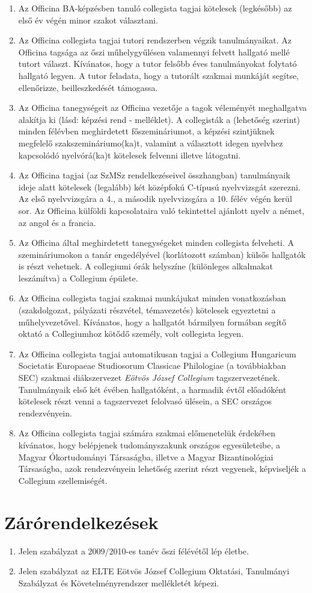 \documentclass{rulebook}
\begin{document}
\begin{enumerate}
	\item Az Officina BA-képzésben tanuló collegista tagjai kötelesek (legkésőbb) az első év végén minor szakot választani.
	\item Az Officina collegista tagjai tutori rendszerben végzik tanulmányaikat. Az Officina tagsága az őszi műhelygyűlésen valamennyi felvett hallgató mellé tutort választ. Kívánatos, hogy a tutor felsőbb éves tanulmányokat folytató hallgató legyen. A tutor feladata, hogy a tutorált szakmai munkáját segítse, ellenőrizze, beilleszkedését támogassa.
	\item Az Officina tanegységeit az Officina vezetője a tagok véleményét meghallgatva alakítja ki (lásd: képzési rend - melléklet). A collegisták a (lehetőség szerint) minden félévben meghirdetett főszemináriumot, a képzési szintjüknek megfelelő szakszemináriumo(ka)t, valamint a választott idegen nyelvhez kapcsolódó nyelvórá(ka)t kötelesek felvenni illetve látogatni.
	\item Az Officina tagjai (az SzMSz rendelkezéseivel összhangban) tanulmányaik ideje alatt kötelesek (legalább) két középfokú C-típusú nyelvvizsgát szerezni. Az első nyelvvizsgára a 4., a második nyelvvizsgára a 10. félév végén kerül sor. Az Officina külföldi kapcsolataira való tekintettel ajánlott nyelv a német, az angol és a francia.
	\item Az Officina által meghirdetett tanegységeket minden collegista felveheti. A szemináriumokon a tanár engedélyével (korlátozott számban) külsős hallgatók is részt vehetnek. A collegiumi órák helyszíne (különleges alkalmakat leszámítva) a Collegium épülete.
	\item Az Officina collegista tagjai szakmai munkájukat minden vonatkozásban (szakdolgozat, pályázati részvétel, témavezetés) kötelesek egyeztetni a műhelyvezetővel. Kívánatos, hogy a hallgatót bármilyen formában segítő oktató a Collegiumhoz kötődő személy, volt collegista legyen.
	\item Az Officina collegista tagjai automatikusan tagjai a Collegium Hungaricum Societatis Europaeae Studiosorum Classicae Philologiae (a továbbiakban SEC) szakmai diákszervezet \emph{Eötvös József Collegium} tagszervezetének. Tanulmányaik első két évében hallgatóként, a harmadik évtől előadóként kötelesek részt venni a tagszervezet felolvasó ülésein, a SEC országos rendezvényein.
	\item Az Officina collegista tagjai számára szakmai előmenetelük érdekében kívánatos, hogy belépjenek tudományszakunk országos egyesületeibe, a Magyar Ókortudományi Társaságba, illetve a Magyar Bizantinológiai Társaságba, azok rendezvényein lehetőség szerint részt vegyenek, képviseljék a Collegium szellemiségét.
\end{enumerate}


\section{Zárórendelkezések}

\begin{enumerate}
	\item Jelen szabályzat a 2009/2010-es tanév őszi félévétől lép életbe.
	\item Jelen szabályzat az ELTE Eötvös József Collegium Oktatási, Tanulmányi Szabályzat és Követelményrendszer mellékletét képezi.
\end{enumerate}
\end{document}
